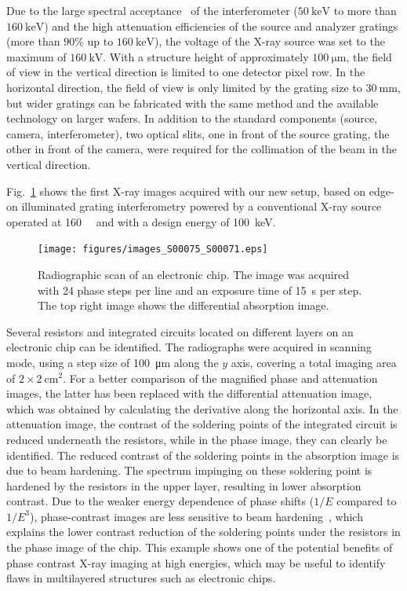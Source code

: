 \documentclass[english]{nature}
\begin{document}
Due to the large spectral acceptance~\cite{Weitkamp2005,Thuering2013c} of the
interferometer ($\SI{50}{\kilo\electronvolt}$ to
more than $\SI{160}{\kilo\electronvolt}$) and the high attenuation efficiencies of
the source and analyzer gratings (more than $90\%$ up to
$\SI{160}{\kilo\electronvolt}$), the voltage of the X-ray source was set to
the maximum of $\SI{160}{\kilo\volt}$. With a structure height of
approximately $\SI{100}{\micro \metre}$, the field of view in the vertical
direction is limited to one detector pixel row. In the horizontal direction,
the field of view is only limited by the grating size to
$\SI{30}{\milli\metre}$, but wider gratings can be fabricated with the same
method and the available technology on larger wafers. In addition to the standard components (source,
camera, interferometer), two optical slits, one in front of the source
grating, the other in front of the camera, were required for the collimation
of the beam in the vertical direction. 

Fig.~\ref{Fig:img_chip} shows the first X-ray images acquired with our new setup, based on
edge-on illuminated grating interferometry powered by a conventional X-ray
source operated at \SI{160}{\kilo\voltpeak} and with a design energy of
\SI{100}{\kilo\eV}.  
\begin{figure}[h!]
    \centering
    \texttt{[image: figures/images\_S00075\_S00071.eps]}
    \caption{Radiographic scan of an electronic chip. The image was acquired
        with 24 phase steps per line and an exposure time of \SI{15}{\second} per
    step. The top right image shows the differential absorption image.}\label{Fig:img_chip}
\end{figure}
Several resistors and integrated circuits located on different
layers on an electronic chip can be identified. The radiographs were acquired in scanning
mode, using a step size of \SI{100}{\micro\metre} along the $y$ axis, covering a total imaging
area of $2 \times \SI{2}{\centi\metre^2}$. For a better comparison of the magnified phase and
attenuation images, the latter has been replaced with the differential
attenuation image, which was obtained by calculating the derivative along
the horizontal axis. In the attenuation image, the contrast of the soldering
points of the integrated circuit is reduced underneath the resistors, while
in the phase image, they can clearly be identified. The reduced contrast of
the soldering points in the absorption image is due to beam hardening. The
spectrum impinging on these soldering point is hardened by the resistors in
the upper layer, resulting in lower absorption contrast. Due to the weaker
energy dependence of phase shifts ($1/E$ compared to $1/E^3$), phase-contrast
images are less sensitive to beam hardening~\cite{Chabior2011a}, which explains the lower
contrast reduction of the soldering points under the resistors in the
phase image of the chip. This example shows one of the potential benefits of
phase contrast X-ray imaging at high energies, which may be useful to
identify flaws in multilayered structures such as electronic chips.
\end{document}
